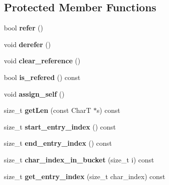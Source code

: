 \subsection*{Protected Member Functions}
\begin{CompactItemize}
\item 
\hypertarget{classdeque__string_11bc7ce3ebb3fc12828c4881c0045787}{
bool \textbf{refer} ()}
\label{classdeque__string_11bc7ce3ebb3fc12828c4881c0045787}

\item 
\hypertarget{classdeque__string_990e1e380a821d7e21d9aa77dc2bb086}{
void \textbf{derefer} ()}
\label{classdeque__string_990e1e380a821d7e21d9aa77dc2bb086}

\item 
\hypertarget{classdeque__string_edd43b4ccd2566df83b68fe92529dc03}{
void \textbf{clear\_\-reference} ()}
\label{classdeque__string_edd43b4ccd2566df83b68fe92529dc03}

\item 
\hypertarget{classdeque__string_53a7dad58bd968cb8f14d2193f76b7d3}{
bool \textbf{is\_\-refered} () const }
\label{classdeque__string_53a7dad58bd968cb8f14d2193f76b7d3}

\item 
\hypertarget{classdeque__string_d2f7587c5f7a25f86198739e15ed3a8e}{
void \textbf{assign\_\-self} ()}
\label{classdeque__string_d2f7587c5f7a25f86198739e15ed3a8e}

\item 
\hypertarget{classdeque__string_c3450eab29fcd26a502dda32da6ab4c5}{
size\_\-t \textbf{getLen} (const CharT $\ast$s) const }
\label{classdeque__string_c3450eab29fcd26a502dda32da6ab4c5}

\item 
\hypertarget{classdeque__string_d8b990aa4bcf75e5145df48385ca15dd}{
size\_\-t \textbf{start\_\-entry\_\-index} () const }
\label{classdeque__string_d8b990aa4bcf75e5145df48385ca15dd}

\item 
\hypertarget{classdeque__string_c6211d2266a6e13c85ded7ec3c2d18d6}{
size\_\-t \textbf{end\_\-entry\_\-index} () const }
\label{classdeque__string_c6211d2266a6e13c85ded7ec3c2d18d6}

\item 
\hypertarget{classdeque__string_01670ff100a023d4b11e8552297e728f}{
size\_\-t \textbf{char\_\-index\_\-in\_\-bucket} (size\_\-t i) const }
\label{classdeque__string_01670ff100a023d4b11e8552297e728f}

\item 
\hypertarget{classdeque__string_1e7a77ee5439a67b0029185079029fab}{
size\_\-t \textbf{get\_\-entry\_\-index} (size\_\-t char\_\-index) const }
\label{classdeque__string_1e7a77ee5439a67b0029185079029fab}


\end{CompactItemize}
